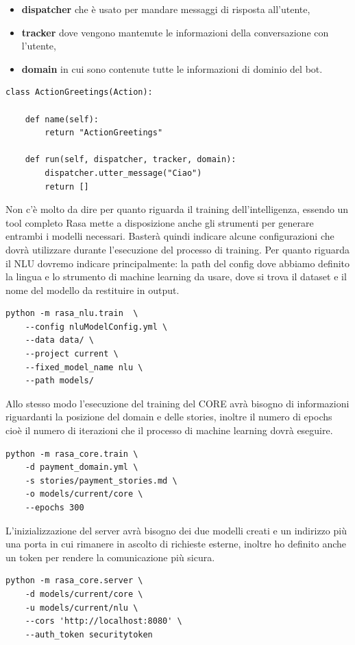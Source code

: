 \begin{itemize}
    \item \textbf{dispatcher} che è usato per mandare messaggi di risposta all'utente, 
    \item \textbf{tracker} dove vengono mantenute le informazioni della conversazione con l'utente,
    \item \textbf{domain} in cui sono contenute tutte le informazioni di dominio del bot.
\end{itemize}
\begin{lstlisting}
class ActionGreetings(Action):

    def name(self):
        return "ActionGreetings"

    def run(self, dispatcher, tracker, domain):
        dispatcher.utter_message("Ciao")
        return []
\end{lstlisting}
Non c'è molto da dire per quanto riguarda il training dell'intelligenza, essendo un tool completo Rasa mette a disposizione anche gli strumenti per generare entrambi i modelli necessari. Basterà quindi indicare alcune configurazioni che dovrà utilizzare durante l'esecuzione del processo di training.
Per quanto riguarda il NLU dovremo indicare principalmente: la path del config dove abbiamo definito la lingua e lo strumento di machine learning da usare, dove si trova il dataset e il nome del modello da restituire in output.
\begin{lstlisting}
python -m rasa_nlu.train  \
    --config nluModelConfig.yml \
    --data data/ \
    --project current \
    --fixed_model_name nlu \
    --path models/
\end{lstlisting}
Allo stesso modo l'esecuzione del training del CORE avrà bisogno di informazioni riguardanti la posizione del domain e delle stories, inoltre il numero di epochs cioè il numero di iterazioni che il processo di machine learning dovrà eseguire.
\begin{lstlisting}
python -m rasa_core.train \
    -d payment_domain.yml \
    -s stories/payment_stories.md \
    -o models/current/core \
    --epochs 300
\end{lstlisting}
L'inizializzazione del server avrà bisogno dei due modelli creati e un indirizzo più una porta in cui rimanere in ascolto di richieste esterne, inoltre ho definito anche un token per rendere la comunicazione più sicura.
\begin{lstlisting}
python -m rasa_core.server \
    -d models/current/core \
    -u models/current/nlu \
    --cors 'http://localhost:8080' \
    --auth_token securitytoken
\end{lstlisting}

